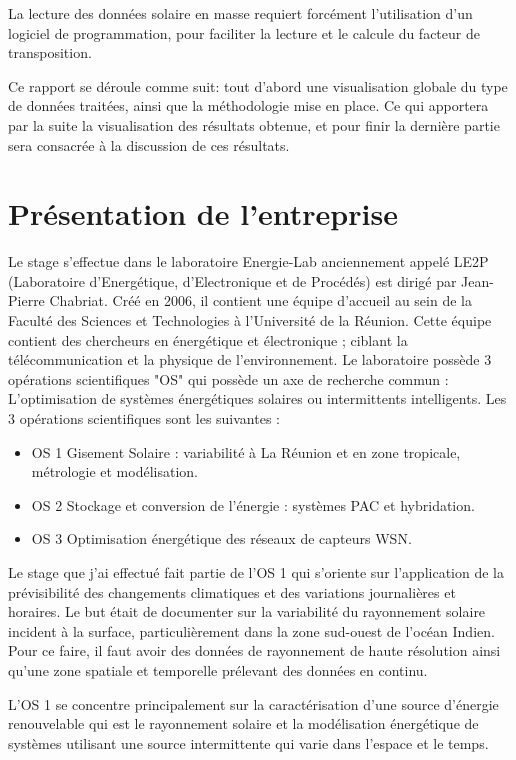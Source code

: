 \documentclass[12pt,a4paper,openright]{report}
\begin{document}
 La lecture des données solaire en masse requiert forcément l'utilisation d'un logiciel de programmation, pour faciliter la lecture et le calcule du facteur de transposition. 

Ce rapport se déroule comme suit: 
tout d'abord une visualisation globale du type de données traitées, ainsi que la méthodologie mise en place. Ce qui apportera par la suite la visualisation des résultats obtenue, et pour finir la dernière partie sera consacrée à la discussion de ces résultats.

\newpage
\section{Présentation de l'entreprise}
Le stage s'effectue dans le laboratoire Energie-Lab anciennement appelé LE2P (Laboratoire d'Energétique, d'Electronique et de Procédés) est dirigé par Jean-Pierre Chabriat. Créé en 2006, il contient une équipe d'accueil au sein de la Faculté des Sciences et Technologies à l'Université de la Réunion. Cette équipe contient des chercheurs en énergétique et électronique ; ciblant la télécommunication et la physique de l'environnement.
Le laboratoire possède 3 opérations scientifiques "OS" qui possède un axe de recherche commun : L'optimisation de systèmes énergétiques solaires ou intermittents intelligents.
Les 3 opérations scientifiques sont les suivantes :
\begin{itemize}
\item OS 1 Gisement Solaire : variabilité à La Réunion et en zone tropicale, métrologie et modélisation.
\item OS 2 Stockage et conversion de l’énergie : systèmes PAC et hybridation.
\item OS 3 Optimisation énergétique des réseaux de capteurs WSN.
\end{itemize}
Le stage que j'ai effectué fait partie de l'OS 1 qui s'oriente sur l'application de la  prévisibilité des changements climatiques et des variations journalières et horaires. Le but était de documenter sur la variabilité du rayonnement solaire incident à la surface, particulièrement dans la zone sud-ouest de l'océan Indien. Pour ce faire, il faut avoir des données de rayonnement de haute résolution ainsi qu'une zone spatiale et temporelle prélevant des données en continu.

L'OS 1 se concentre principalement sur la caractérisation d'une source d'énergie renouvelable qui est le rayonnement solaire et la modélisation énergétique de systèmes utilisant une source intermittente qui varie dans l'espace et le temps.
\end{document}
